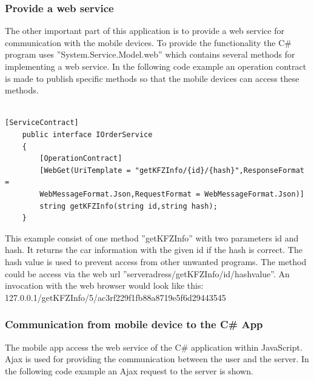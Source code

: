 \newpage
\subsubsection{Provide a web service}

The other important part of this application is to provide a web service for communication with the mobile devices.  To provide the functionality the C\# program uses ''System.Service.Model.web'' which contains several methods for implementing a web service.  In the following code example an operation contract is made to publish specific methods so that the mobile devices can access these methods.
\\\\
\begin{lstlisting}[caption=
ServiceContract,captionpos=b]
[ServiceContract]
    public interface IOrderService
    {
        [OperationContract]
        [WebGet(UriTemplate = "getKFZInfo/{id}/{hash}",ResponseFormat =           
        WebMessageFormat.Json,RequestFormat = WebMessageFormat.Json)]
        string getKFZInfo(string id,string hash);
    }
\end{lstlisting}

This example consist of one method ''getKFZInfo'' with two parameters id and hash. It returns the car information with the given id if the hash is correct. The hash value is used to prevent access from other unwanted programs. The method could be access via the web url ''serveradress/getKFZInfo/id/hashvalue''. An invocation with the web browser would look like this:  127.0.0.1/getKFZInfo/5/ac3rf229f1fb88a8719e5f6d29443545
\newpage
\subsubsection{Communication from mobile device to the C\# App}

The mobile app access the web service of the C\# application within JavaScript. Ajax is used for providing the communication between the user and the server. In the following code example an Ajax request to the server is shown.


